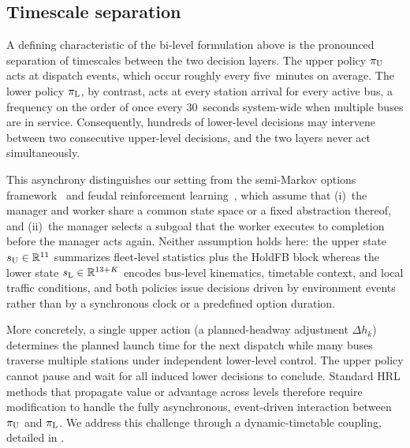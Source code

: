 \subsection{Timescale separation}
\label{sec:timescale}

A defining characteristic of the bi-level formulation above is the pronounced separation of timescales between the two decision layers.
The upper policy $\pi_{\mathrm{U}}$ acts at dispatch events, which occur roughly every five~minutes on average.
The lower policy $\pi_{\mathrm{L}}$, by contrast, acts at every station arrival for every active bus, a frequency on the order of once every 30~seconds system-wide when multiple buses are in service.
Consequently, hundreds of lower-level decisions may intervene between two consecutive upper-level decisions, and the two layers never act simultaneously.

This asynchrony distinguishes our setting from the semi-Markov options framework~\citep{sutton1999between} and feudal reinforcement learning~\citep{dayan1992feudal,vezhnevets2017feudal}, which assume that (i)~the manager and worker share a common state space or a fixed abstraction thereof, and (ii)~the manager selects a subgoal that the worker executes to completion before the manager acts again.
Neither assumption holds here: the upper state $s_{\mathrm{U}}\in\mathbb{R}^{11}$ summarizes fleet-level statistics plus the HoldFB block whereas the lower state $s_{\mathrm{L}}\in\mathbb{R}^{13+K}$ encodes bus-level kinematics, timetable context, and local traffic conditions, and both policies issue decisions driven by environment events rather than by a synchronous clock or a predefined option duration.

More concretely, a single upper action (a planned-headway adjustment $\Delta h_k$) determines the planned launch time for the next dispatch while many buses traverse multiple stations under independent lower-level control. The upper policy cannot pause and wait for all induced lower decisions to conclude.
Standard HRL methods that propagate value or advantage across levels therefore require modification to handle the fully asynchronous, event-driven interaction between $\pi_{\mathrm{U}}$ and $\pi_{\mathrm{L}}$.
We address this challenge through a dynamic-timetable coupling, detailed in .

